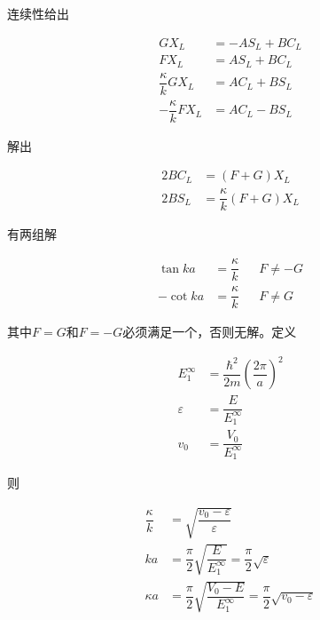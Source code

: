 \documentclass{article}
\begin{document}
连续性给出

\begin{equation*}
  \begin{aligned}
    G X_L &= - AS_L + BC_L \\
    F X_L &= A S_L + BC_L \\
    \dfrac{\kappa}{k} GX_L &= AC_L + BS_L \\
    - \dfrac{\kappa}{k} FX_L &= AC_L - BS_L
  \end{aligned}
\end{equation*}

解出

\begin{equation*}
  \begin{aligned}
    2BC_L &= \left( F + G \right) X_L \\
    2BS_L &= \dfrac{\kappa}{k} \left( F + G \right) X_L 
  \end{aligned}
\end{equation*}

有两组解

\begin{equation*}
  \begin{aligned}
    \tan ka &= \dfrac{\kappa}{k} && F\neq -G \\
    -\cot ka &= \dfrac{\kappa}{k} && F \neq G 
  \end{aligned}
\end{equation*}

其中$F= G$和$F= -G$必须满足一个，否则无解。定义

\begin{equation*}
  \begin{aligned}
    E_1^{\infty} &= \dfrac{\hbar^2}{2m} \left( \dfrac{2\pi}{a}  \right)^2 \\
    \varepsilon &= \dfrac{E}{E_1^{\infty}} \\
    v_0 &= \dfrac{V_0}{E_1^{\infty}} 
  \end{aligned}
\end{equation*}

则

\begin{equation*}
  \begin{aligned}
    \dfrac{\kappa}{k} &= \sqrt{\dfrac{v_0 - \varepsilon}{\varepsilon} } \\
    k a &= \dfrac{\pi}{2} \sqrt{\dfrac{E}{E_1^{\infty}} } = \dfrac{\pi}{2} \sqrt{\varepsilon}  \\
    \kappa a &= \dfrac{\pi}{2} \sqrt{\dfrac{V_0 - E}{E_1^{\infty}} } = \dfrac{\pi}{2} \sqrt{v_0 - \varepsilon}  
  \end{aligned}
\end{equation*}
\end{document}
